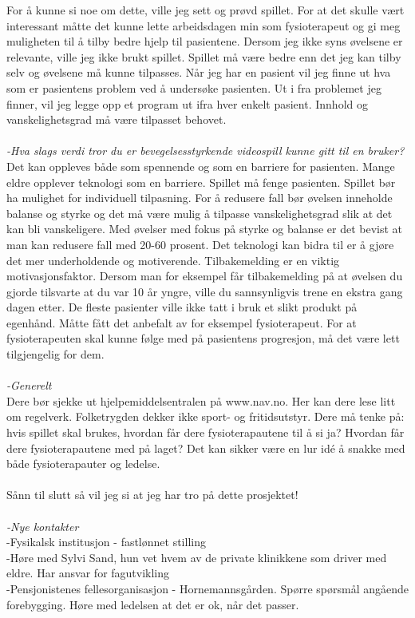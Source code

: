 For å kunne si noe om dette, ville jeg sett og prøvd spillet. For at det skulle vært interessant måtte det kunne lette arbeidsdagen min som fysioterapeut og gi meg muligheten til å tilby bedre hjelp til pasientene. Dersom jeg ikke syns øvelsene er relevante, ville jeg ikke brukt spillet. Spillet må være bedre enn det jeg kan tilby selv og øvelsene må kunne tilpasses. Når jeg har en pasient vil jeg finne ut hva som er pasientens problem ved å undersøke pasienten. Ut i fra problemet jeg finner, vil jeg legge opp et program ut ifra hver enkelt pasient. Innhold og vanskelighetsgrad må være tilpasset behovet. \\ \\ 
\emph{-Hva slags verdi tror du er bevegelsesstyrkende videospill kunne gitt til en bruker?}\\ 
Det kan oppleves både som spennende og som en barriere for pasienten. Mange eldre opplever teknologi som en barriere. Spillet må fenge pasienten. Spillet bør ha mulighet for individuell tilpasning. For å redusere fall bør øvelsen inneholde balanse og styrke og det må være mulig å tilpasse vanskelighetsgrad slik at det kan bli vanskeligere. Med øvelser med fokus på styrke og balanse er det bevist at man kan redusere fall med 20-60 prosent. Det teknologi kan bidra til er å gjøre det mer underholdende og motiverende. Tilbakemelding er en viktig motivasjonsfaktor. Dersom man for eksempel får tilbakemelding på at øvelsen du gjorde tilsvarte at du var 10 år yngre, ville du sannsynligvis trene en ekstra gang dagen etter. De fleste pasienter ville ikke tatt i bruk et slikt produkt på egenhånd. Måtte fått det anbefalt av for eksempel fysioterapeut. For at fysioterapeuten skal kunne følge med på pasientens progresjon, må det være lett tilgjengelig for dem.\\ \\ 
\emph{-Generelt} \\ 
Dere bør sjekke ut hjelpemiddelsentralen på www.nav.no. Her kan dere lese litt om regelverk. Folketrygden dekker ikke sport- og fritidsutstyr. Dere må tenke på: hvis spillet skal brukes, hvordan får dere fysioterapautene til å si ja? Hvordan får dere fysioterapautene med på laget? Det kan sikker være en lur idé å snakke med både fysioterapauter og ledelse.\\ \\ Sånn til slutt så vil jeg si at jeg har tro på dette prosjektet!\\ \\
\emph{-Nye kontakter} \\ 
-Fysikalsk institusjon - fastlønnet stilling\\
-Høre med Sylvi Sand, hun vet hvem av de private klinikkene som driver med eldre. Har ansvar for fagutvikling \\
-Pensjonistenes fellesorganisasjon - Hornemannsgården. Spørre spørsmål angående forebygging. Høre med ledelsen at det er ok, når det passer. 

